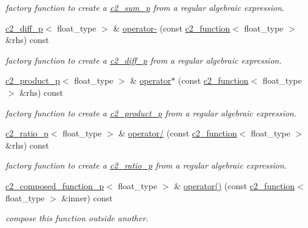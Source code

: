 \begin{DoxyCompactItemize}
\begin{DoxyCompactList}\small\item\em factory function to create a \hyperlink{classc2__sum__p}{c2\+\_\+sum\+\_\+p} from a regular algebraic expression. \end{DoxyCompactList}\item 
\hyperlink{classc2__diff__p}{c2\+\_\+diff\+\_\+p}$<$ float\+\_\+type $>$ \& \hyperlink{classc2__function_a4c56a4673e00bfad37143c403a0c94c8}{operator-\/} (const \hyperlink{classc2__function}{c2\+\_\+function}$<$ float\+\_\+type $>$ \&rhs) const 
\begin{DoxyCompactList}\small\item\em factory function to create a \hyperlink{classc2__diff__p}{c2\+\_\+diff\+\_\+p} from a regular algebraic expression. \end{DoxyCompactList}\item 
\hyperlink{classc2__product__p}{c2\+\_\+product\+\_\+p}$<$ float\+\_\+type $>$ \& \hyperlink{classc2__function_a7744675c98a8ec63320ac1c0b61bec9c}{operator$\ast$} (const \hyperlink{classc2__function}{c2\+\_\+function}$<$ float\+\_\+type $>$ \&rhs) const 
\begin{DoxyCompactList}\small\item\em factory function to create a \hyperlink{classc2__product__p}{c2\+\_\+product\+\_\+p} from a regular algebraic expression. \end{DoxyCompactList}\item 
\hyperlink{classc2__ratio__p}{c2\+\_\+ratio\+\_\+p}$<$ float\+\_\+type $>$ \& \hyperlink{classc2__function_a93ac28dfe5daebea84d147b8e346e60c}{operator/} (const \hyperlink{classc2__function}{c2\+\_\+function}$<$ float\+\_\+type $>$ \&rhs) const 
\begin{DoxyCompactList}\small\item\em factory function to create a \hyperlink{classc2__ratio__p}{c2\+\_\+ratio\+\_\+p} from a regular algebraic expression. \end{DoxyCompactList}\item 
\hyperlink{classc2__composed__function__p}{c2\+\_\+composed\+\_\+function\+\_\+p}$<$ float\+\_\+type $>$ \& \hyperlink{classc2__function_a9332f7b389579a9b03eb57578649e07f}{operator()} (const \hyperlink{classc2__function}{c2\+\_\+function}$<$ float\+\_\+type $>$ \&inner) const 
\begin{DoxyCompactList}\small\item\em compose this function outside another. \end{DoxyCompactList}\item 

\end{DoxyCompactItemize}
